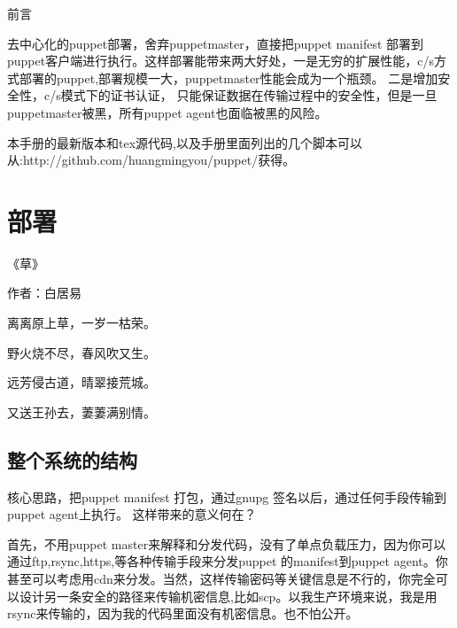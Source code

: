 \newpage
\begin{center}
\kai 前言
\end{center}
\fzsk
\par
去中心化的puppet部署，舍弃puppetmaster，直接把puppet manifest 部署到puppet客户端进行执行。这样部署能带来两大好处，一是无穷的扩展性能，c/s方式部署的puppet,部署规模一大，puppetmaster性能会成为一个瓶颈。 二是增加安全性，c/s模式下的证书认证，
只能保证数据在传输过程中的安全性，但是一旦puppetmaster被黑，所有puppet agent也面临被黑的风险。\par
本手册的最新版本和tex源代码,以及手册里面列出的几个脚本可以从:http://github.com/huangmingyou/puppet/获得。
\song
\newpage
\chapter{\msyh 部署}
\begin{center}
\kai\small

《草》\par
作者：白居易 \par
离离原上草，一岁一枯荣。 \par
野火烧不尽，春风吹又生。 \par
远芳侵古道，晴翠接荒城。 \par
又送王孙去，萋萋满别情。 \par
\end{center}



\section{\msyh \small 整个系统的结构}
\fzsk 

核心思路，把puppet manifest 打包，通过gnupg 签名以后，通过任何手段传输到 puppet agent上执行。 这样带来的意义何在？ 
\par
首先，不用puppet master来解释和分发代码，没有了单点负载压力，因为你可以通过ftp,rsync,https,等各种传输手段来分发puppet 的manifest到puppet agent。你甚至可以考虑用cdn来分发。当然，这样传输密码等关键信息是不行的，你完全可以设计另一条安全的路径来传输机密信息,比如scp。以我生产环境来说，我是用rsync来传输的，因为我的代码里面没有机密信息。也不怕公开。

